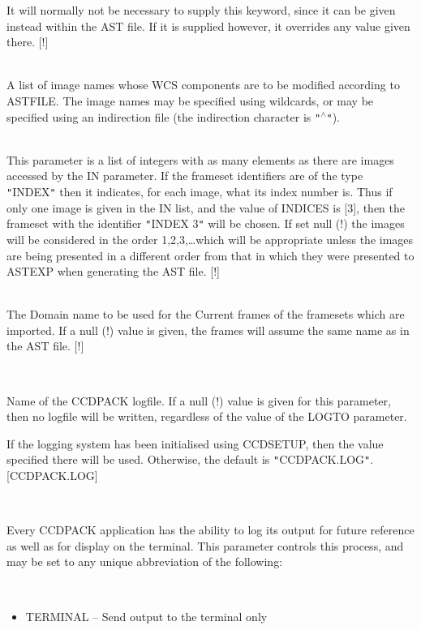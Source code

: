 \documentclass[twoside,11pt]{article}
\newcommand{\htmlref}[2]{#1}
\renewcommand{\_}{\texttt{\symbol{95}}}
\newcommand{\qt}[1]{{\tt "}#1{\tt "}}
\newcommand{\xroutine}[1]{\htmlref{{\sc #1}}{#1}}
\newcommand{\sstsubsection}[1]{ \item[{#1}] \mbox{} \\}
\newcommand{\sstitemlist}[1]{
  \mbox{} \\
  \vspace{-3.5ex}
  \begin{itemize}
     #1
  \end{itemize}
}
\newcommand{\sstitem}{\item}
\newcommand{\sstsubsection}[1]{\item[{#1}]}
\newcommand{\sstitemlist}[1]{
      \begin{itemize}
         #1
      \end{itemize}
      \\
   }
\newcommand{\sstitem}{\item}
\begin{document}
{{{         It will normally not be necessary to supply this keyword,
         since it can be given instead within the AST file.  If it is
         supplied however, it overrides any value given there. 
         [!]
      }
      \sstsubsection{
         IN = LITERAL (Read)
      } {
         A list of image names whose WCS components are to be modified
         according to ASTFILE.  The image names may be specified using
         wildcards, or may be specified using an indirection file
         (the indirection character is \qt{$^\wedge$}).
      }
      \sstsubsection{
         INDICES( $*$ ) = \_INTEGER (Read)
      } {
         This parameter is a list of integers with as many elements as
         there are images accessed by the IN parameter.  If the frameset
         identifiers are of the type \qt{INDEX} then it indicates, for
         each image, what its index number is.  Thus if only one image is
         given in the IN list, and the value of INDICES is [3], then
         the frameset with the identifier \qt{INDEX 3} will be chosen.
         If set null (!) the images will be considered in the order
         1,2,3,\ldots which will be appropriate unless the images are being
         presented in a different order from that in which they were
         presented to \xroutine{ASTEXP} when generating the AST file.
         [!]
      }
      \sstsubsection{
         INDOMAIN = LITERAL (Read)
      } {
         The Domain name to be used for the Current frames of the
         framesets which are imported.  If a null (!) value is given,
         the frames will assume the same name as in the AST file.
         [!]
      }
      \sstsubsection{
         LOGFILE = FILENAME (Read)
      } {
         Name of the CCDPACK logfile.  If a null (!) value is given for
         this parameter, then no logfile will be written, regardless of
         the value of the LOGTO parameter.

         If the logging system has been initialised using \xroutine{CCDSETUP},
         then the value specified there will be used. Otherwise, the
         default is \qt{CCDPACK.LOG}.
         [CCDPACK.LOG]
      }
      \sstsubsection{
         LOGTO = LITERAL (Read)
      } {
         Every CCDPACK application has the ability to log its output
         for future reference as well as for display on the terminal.
         This parameter controls this process, and may be set to any
         unique abbreviation of the following:
         \sstitemlist{

            \sstitem
               TERMINAL  -- Send output to the terminal only

}}}}
\end{document}
